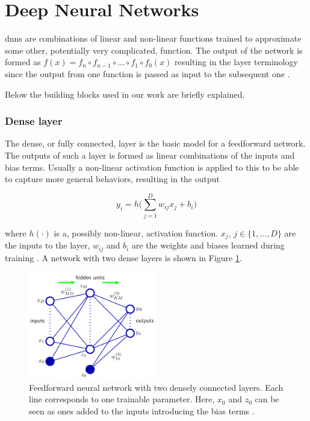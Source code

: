 \section{Deep Neural Networks}
\glspl{dnn} are combinations of linear and non-linear functions trained to approximate some other, potentially very complicated, function. The output of the network is formed as $f(x) = f_n \circ f_{n-1} \circ \hdots \circ f_1 \circ f_0(x)$ resulting in the layer terminology since the output from one function is passed as input to the subsequent one \cite{Goodfellow2016}.

Below the building blocks used in our work are briefly explained.

\subsubsection{Dense layer}
The dense, or fully connected, layer is the basic model for a feedforward network. The outputs of such a layer is formed as linear combinations of the inputs and bias terms. Usually a non-linear activation function is applied to this to be able to capture more general behaviors, resulting in the output

\begin{equation}
 y_i = h\Big( \sum_{j=1}^D w_{ij}x_j + b_i \Big)
 \label{eq:dense}
\end{equation}

where $h(\cdot)$ is a, possibly non-linear, activation function. $x_j$, $j \in \{1, \hdots, D\}$ are the inputs to the layer, $w_{ij}$ and $b_i$ are the weights and biases learned during training \cite{Bishop2006}. A network with two dense layers is shown in Figure \ref{fig:dense}.

\begin{figure}
 \centering
 \includegraphics[width=0.5\textwidth]{files/figs/backg/mlp.png}
 \caption{Feedforward neural network with two densely connected layers. Each line corresponds to one trainable parameter. Here, $x_0$ and $z_0$ can be seen as ones added to the inputs introducing the bias terms \cite{Bishop2006}.}
 \label{fig:dense}
\end{figure}

